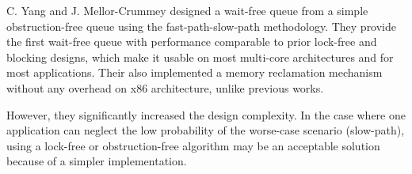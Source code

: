 C. Yang and J. Mellor-Crummey designed a wait-free queue from a simple
obstruction-free queue using the fast-path-slow-path methodology. They provide
the first wait-free queue with performance comparable to prior lock-free and
blocking designs, which make it usable on most multi-core architectures and for
most applications. Their also implemented a memory reclamation mechanism without
any overhead on x86 architecture, unlike previous works.

However, they significantly increased the design complexity. In the case where
one application can neglect the low probability of the worse-case scenario
(slow-path), using a lock-free or obstruction-free algorithm may be an
acceptable solution because of a simpler implementation.
